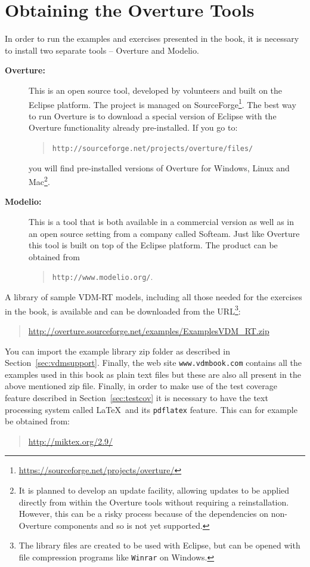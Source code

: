 \section{Obtaining the Overture Tools}\label{sec:install}

In order to run the examples and exercises presented in the book, it
is necessary to install two separate tools -- Overture and Modelio.
\begin{description}
\item[\textbf{Overture:}] This
 is an open source tool, developed by volunteers and built on
the Eclipse platform. The project is managed on
SourceForge\footnote{\url{https://sourceforge.net/projects/overture/}}.
The best way to run Overture is to download a special version of
Eclipse with the Overture functionality already pre-installed. If you
go to:
  \begin{quote}
  \texttt{http://sourceforge.net/projects/overture/files/}
  \end{quote}
  \noindent you will find pre-installed versions of Overture for
  Windows, Linux and Mac\footnote{It is planned to develop an update
    facility, allowing updates to be applied directly from within the
    Overture tools without requiring a reinstallation. However, this
    can be a risky process because of the dependencies on non-Overture
    components and so is not yet supported.}.

\item[\textbf{Modelio:}] This is a tool that is both available in a commercial version as well as in an open source setting from a
  company called Softeam. Just like Overture this tool is built on top of the Eclipse platform. The product can be
  obtained from
\begin{quote}
\texttt{http://www.modelio.org/}.
\end{quote}
\end{description}

A library of sample VDM-RT models, including all those needed
for the exercises in the book, is available and can be downloaded from
the
URL\footnote{The library files are created to be used with Eclipse,
  but can be opened with file compression programs like \texttt{Winrar} on
  Windows.}:
\begin{quote}
\url{http://overture.sourceforge.net/examples/ExamplesVDM_RT.zip}
\end{quote}
You can import the example library zip folder as described in
Section~\ref{sec:vdmsupport}.  Finally, the web site
\texttt{www.vdmbook.com} contains all the examples used in this book
as plain text files but these are also all present in the above
mentioned zip file. Finally, in order to make use of the
test coverage feature described in Section~\ref{sec:testcov} it is
necessary to have the text processing system called \LaTeX\ and its
\texttt{pdflatex} feature. This can for example be obtained from:
\begin{quote}
\url{http://miktex.org/2.9/}
\end{quote}

